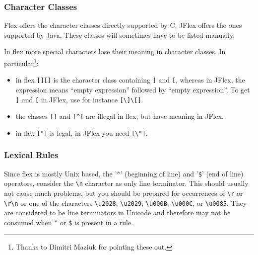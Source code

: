 \subsubsection{Character Classes}\label{character-classes}

Flex offers the character classes directly supported by C, JFlex offers
the ones supported by Java. These classes will sometimes have to be
listed manually.

In flex more special characters lose their meaning in character classes.
In particular\footnote{Thanks to Dimitri Maziuk for pointing these out.}:

\begin{itemize}
\item
  in flex \texttt{{[}{]}{[}{]}} is the character class containing
  \texttt{{]}} and \texttt{{[}}, whereas in JFlex, the expression means
  ``empty expression'' followed by ``empty expression''. To get
  \texttt{{]}} and \texttt{{[}} in JFlex, use for instance
  \texttt{{[}\textbackslash{}{]}\textbackslash{}{[}{]}}.
\item
  the classes \texttt{{[}{]}} and \texttt{{[}\^{}{]}} are illegal in
  flex, but have meaning in JFlex.
\item
  in flex \texttt{{[}"{]}} is legal, in JFlex you need
  \texttt{{[}\textbackslash{}"{]}}.
\end{itemize}

\subsubsection{Lexical Rules}\label{lexical-rules}

Since flex is mostly Unix based, the '\texttt{\^{}}' (beginning of line)
and '\texttt{\$}' (end of line) operators, consider the
\texttt{\textbackslash{}n} character as only line terminator. This
should usually not cause much problems, but you should be prepared for
occurrences of \texttt{\textbackslash{}r} or
\texttt{\textbackslash{}r\textbackslash{}n} or one of the characters
\texttt{\textbackslash{}u2028}, \texttt{\textbackslash{}u2029},
\texttt{\textbackslash{}u000B}, \texttt{\textbackslash{}u000C}, or
\texttt{\textbackslash{}u0085}. They are considered to be line
terminators in Unicode and therefore may not be consumed when
\texttt{\^{}} or \texttt{\$} is present in a rule.


